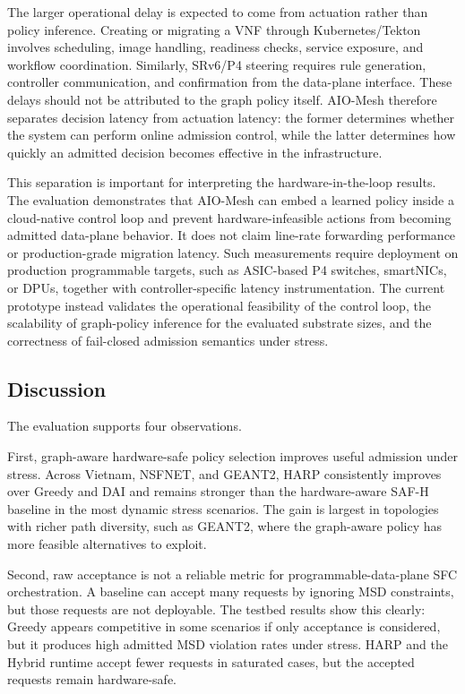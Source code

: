 \documentclass[final,5p]{elsarticle}
\begin{document}
The larger operational delay is expected to come from actuation rather than policy inference. Creating or migrating a VNF through Kubernetes/Tekton involves scheduling, image handling, readiness checks, service exposure, and workflow coordination. Similarly, SRv6/P4 steering requires rule generation, controller communication, and confirmation from the data-plane interface. These delays should not be attributed to the graph policy itself. AIO-Mesh therefore separates decision latency from actuation latency: the former determines whether the system can perform online admission control, while the latter determines how quickly an admitted decision becomes effective in the infrastructure.

This separation is important for interpreting the hardware-in-the-loop results. The evaluation demonstrates that AIO-Mesh can embed a learned policy inside a cloud-native control loop and prevent hardware-infeasible actions from becoming admitted data-plane behavior. It does not claim line-rate forwarding performance or production-grade migration latency. Such measurements require deployment on production programmable targets, such as ASIC-based P4 switches, smartNICs, or DPUs, together with controller-specific latency instrumentation. The current prototype instead validates the operational feasibility of the control loop, the scalability of graph-policy inference for the evaluated substrate sizes, and the correctness of fail-closed admission semantics under stress.


\subsection{Discussion}
\label{subsec:evaluation_discussion}

The evaluation supports four observations.

First, graph-aware hardware-safe policy selection improves useful admission under stress. Across Vietnam, NSFNET, and GEANT2, HARP consistently improves over Greedy and DAI and remains stronger than the hardware-aware SAF-H baseline in the most dynamic stress scenarios. The gain is largest in topologies with richer path diversity, such as GEANT2, where the graph-aware policy has more feasible alternatives to exploit.

Second, raw acceptance is not a reliable metric for programmable-data-plane SFC orchestration. A baseline can accept many requests by ignoring MSD constraints, but those requests are not deployable. The testbed results show this clearly: Greedy appears competitive in some scenarios if only acceptance is considered, but it produces high admitted MSD violation rates under stress. HARP and the Hybrid runtime accept fewer requests in saturated cases, but the accepted requests remain hardware-safe.
\end{document}
